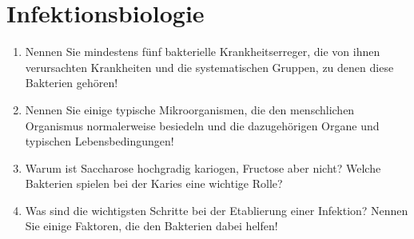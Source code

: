 
\section{Infektionsbiologie}
\begin{enumerate}
	\item Nennen Sie mindestens fünf bakterielle Krankheitserreger, die von ihnen verursachten Krankheiten und die systematischen Gruppen, zu denen diese Bakterien gehören!
	\item Nennen Sie einige typische Mikroorganismen, die den menschlichen Organismus normalerweise besiedeln und die dazugehörigen Organe und typischen Lebensbedingungen!
	\item Warum ist Saccharose hochgradig kariogen, Fructose aber nicht? Welche Bakterien spielen bei der Karies eine wichtige Rolle?
	\item Was sind die wichtigsten Schritte bei der Etablierung einer Infektion? Nennen Sie einige Faktoren, die den Bakterien dabei helfen!
\end{enumerate}
